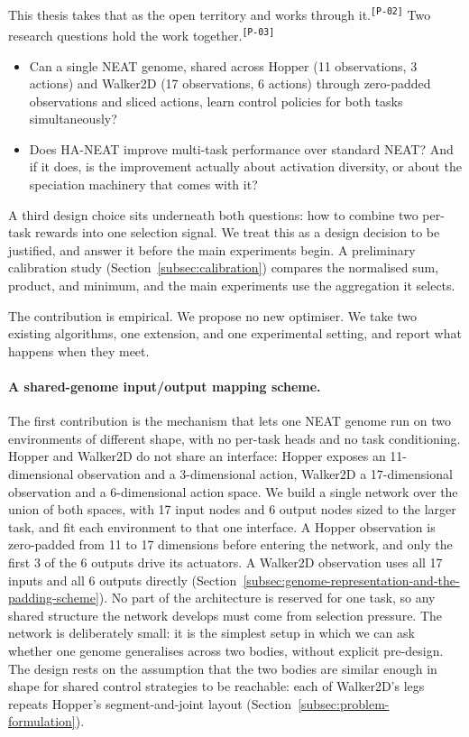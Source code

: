 \documentclass[12pt]{article}
\newcommand{\revID}[1]{\textsuperscript{\scriptsize\texttt{[#1]}}}
\newcommand{\revPlain}[2]{\textcolor{lrGreen}{#2}\revID{#1}}    %
\begin{document}
\revPlain{P-02}{This thesis takes that as the open territory and works through it.}
\revPlain{P-03}{Two research questions hold the work together.}
\begin{itemize}
    \item Can a single NEAT genome, shared across Hopper (11 observations, 3 actions) and Walker2D (17 observations, 6 actions) through zero-padded observations and sliced actions, learn control policies for both tasks simultaneously?
    \item Does HA-NEAT improve multi-task performance over standard NEAT? And if it does, is the improvement actually about activation diversity, or about the speciation machinery that comes with it?
\end{itemize}
A third design choice sits underneath both questions: how to combine two per-task rewards into one selection signal.
We treat this as a design decision to be justified, and answer it before the main experiments begin.
A preliminary calibration study (Section~\ref{subsec:calibration}) compares the normalised sum, product, and minimum, and the main experiments use the aggregation it selects.

The contribution is empirical.
We propose no new optimiser. We take two existing algorithms, one extension, and one experimental setting, and report what happens when they meet.

\paragraph{A shared-genome input/output mapping scheme.}
The first contribution is the mechanism that lets one NEAT genome run on two environments of different shape, with no per-task heads and no task conditioning.
Hopper and Walker2D do not share an interface: Hopper exposes an 11-dimensional observation and a 3-dimensional action, Walker2D a 17-dimensional observation and a 6-dimensional action space.
We build a single network over the union of both spaces, with 17 input nodes and 6 output nodes sized to the larger task, and fit each environment to that one interface.
A Hopper observation is zero-padded from 11 to 17 dimensions before entering the network, and only the first 3 of the 6 outputs drive its actuators. A Walker2D observation uses all 17 inputs and all 6 outputs directly (Section~\ref{subsec:genome-representation-and-the-padding-scheme}).
No part of the architecture is reserved for one task, so any shared structure the network develops must come from selection pressure.
The network is deliberately small: it is the simplest setup in which we can ask whether one genome generalises across two bodies, without explicit pre-design.
The design rests on the assumption that the two bodies are similar enough in shape for shared control strategies to be reachable: each of Walker2D's legs repeats Hopper's segment-and-joint layout (Section~\ref{subsec:problem-formulation}).
\end{document}
